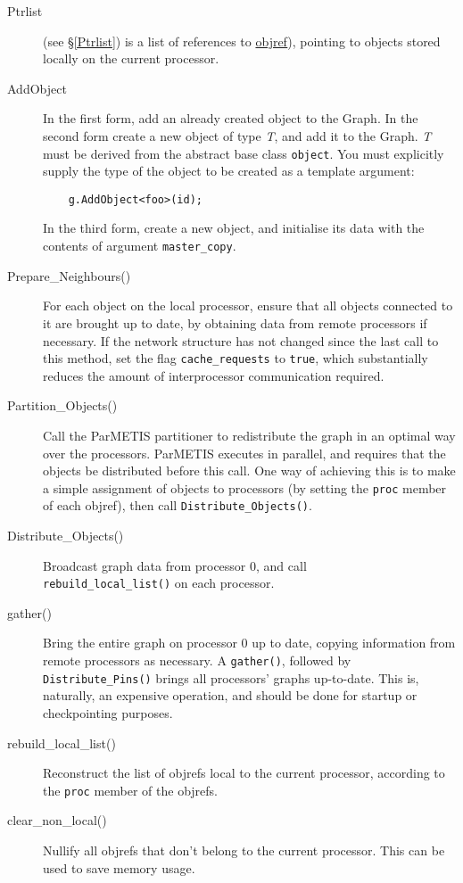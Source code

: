 \begin{description}
\item[Ptrlist](see \S\ref{Ptrlist}) is a list of
  references to \hyperref{{\em objrefs}}{
    (\S}{)}{objref}), pointing to objects stored locally
  on the current processor.
\item[AddObject] In the first form, add an already
  created object to the Graph. In the second form create a new object
  of type {\em T}, and add it to the Graph. {\em T} must be derived
  from the abstract base class \verb+object+. You must
  explicitly supply the type of the object to be created as a template
  argument:
  \begin{verbatim}
    g.AddObject<foo>(id);
  \end{verbatim}
  In the third form, create a new object, and initialise its data with
  the contents of argument \verb+master_copy+.
\item[Prepare\_Neighbours()] For each
  object on the local processor, ensure that all objects connected to
  it are brought up to date, by obtaining data from remote processors
  if necessary. If the network structure has not changed since the
  last call to this method, set the flag
  \verb+cache_requests+ to \verb+true+, which
  substantially reduces the amount of interprocessor communication
  required.
\item[Partition\_Objects()] Call the ParMETIS
  partitioner to redistribute the graph in an optimal way over the
  processors. ParMETIS executes in parallel, and requires that the
  objects be distributed before this call. One way of achieving this is
  to make a simple assignment of objects to processors (by setting the
  \verb+proc+ member of each objref), then call \verb+Distribute_Objects()+.
\item[Distribute\_Objects()] Broadcast graph data
  from processor 0, and call \\\verb+rebuild_local_list()+ on each
  processor.
\item[gather()] Bring the entire graph on processor 0 up
  to date, copying information from remote processors as necessary. A
  \verb+gather()+, followed by \verb+Distribute_Pins()+ brings all
  processors' graphs up-to-date. This is, naturally, an expensive
  operation, and should be done for startup or checkpointing purposes.
\item[rebuild\_local\_list()] Reconstruct
  the list of objrefs local to the current processor, according to the
  \verb+proc+ member of the objrefs.
\item[clear\_non\_local()] Nullify all
  objrefs that don't belong to the current processor. This can be used
  to save memory usage.
\end{description}

